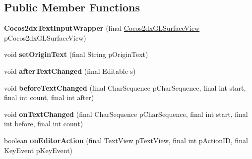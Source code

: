 \subsection*{Public Member Functions}
\begin{DoxyCompactItemize}
\item 
\mbox{\label{classorg_1_1cocos2dx_1_1lib_1_1Cocos2dxTextInputWrapper_a6a0cb7b113ad64b2562236a08f96cf12}} 
{\bfseries Cocos2dx\+Text\+Input\+Wrapper} (final \hyperlink{classorg_1_1cocos2dx_1_1lib_1_1Cocos2dxGLSurfaceView}{Cocos2dx\+G\+L\+Surface\+View} p\+Cocos2dx\+G\+L\+Surface\+View)
\item 
\mbox{\label{classorg_1_1cocos2dx_1_1lib_1_1Cocos2dxTextInputWrapper_a5bc68fe140249a8ef9e3a6106b4bcd9c}} 
void {\bfseries set\+Origin\+Text} (final String p\+Origin\+Text)
\item 
\mbox{\label{classorg_1_1cocos2dx_1_1lib_1_1Cocos2dxTextInputWrapper_aff7227d926fb6b99924db8f895dc3da0}} 
void {\bfseries after\+Text\+Changed} (final Editable s)
\item 
\mbox{\label{classorg_1_1cocos2dx_1_1lib_1_1Cocos2dxTextInputWrapper_acf8a37a45e6dbfc1cf6ef2d8eb0559d9}} 
void {\bfseries before\+Text\+Changed} (final Char\+Sequence p\+Char\+Sequence, final int start, final int count, final int after)
\item 
\mbox{\label{classorg_1_1cocos2dx_1_1lib_1_1Cocos2dxTextInputWrapper_ad821c3c8e35e975a157f5d0282034e3a}} 
void {\bfseries on\+Text\+Changed} (final Char\+Sequence p\+Char\+Sequence, final int start, final int before, final int count)
\item 
\mbox{\label{classorg_1_1cocos2dx_1_1lib_1_1Cocos2dxTextInputWrapper_a9bd2845f3814124988e0751e3a6109bb}} 
boolean {\bfseries on\+Editor\+Action} (final Text\+View p\+Text\+View, final int p\+Action\+ID, final Key\+Event p\+Key\+Event)
\item 
\mbox{\label{classorg_1_1cocos2dx_1_1lib_1_1Cocos2dxTextInputWrapper_a6a0cb7b113ad64b2562236a08f96cf12}} 

\end{DoxyCompactItemize}
